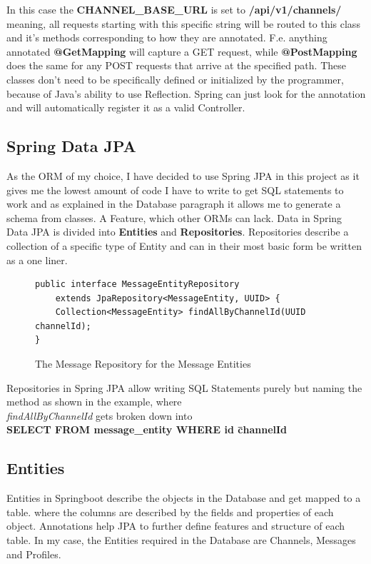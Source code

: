 \documentclass[a4paper,12pt]{article}
\begin{document}
	In this case the \textbf{CHANNEL\_BASE\_URL} is set to \textbf{/api/v1/channels/} meaning, all requests starting
	with this specific string will be routed to this class and it's methods corresponding to how they are annotated.
	F.e. anything annotated \textbf{@GetMapping} will capture a GET request, while \textbf{@PostMapping} does the 
	same for any POST requests that arrive at the specified path. These classes don't need to be specifically defined
	or initialized by the programmer, because of Java's ability to use Reflection. Spring can just look for the
	annotation and will automatically register it as a valid Controller.

	\subsection{Spring Data JPA}
	\label{subsec:spring_data_jpa}
	As the ORM of my choice, I have decided to use Spring JPA in this project as it gives me the lowest amount of
	code I have to write to get SQL statements to work and as explained in the Database paragraph it allows me to
	generate a schema from classes. A Feature, which other ORMs can lack.
	Data in Spring Data JPA is divided into \textbf{Entities} and \textbf{Repositories}. Repositories describe a
	collection of a specific type of Entity and can in their most basic form be written as a one liner.
	\begin{figure}[ht!]
		\begin{lstlisting}
public interface MessageEntityRepository 
	extends JpaRepository<MessageEntity, UUID> {
	Collection<MessageEntity> findAllByChannelId(UUID channelId);
}
		\end{lstlisting}
		\caption{The Message Repository for the Message Entities}
	\end{figure}
	Repositories in Spring JPA allow writing SQL Statements purely but naming the method as shown in the example,
	where\\ 
	\textit{findAllByChannelId} gets broken down into \\ 
	\textbf{SELECT \* FROM message\_entity WHERE id \= channelId}

	\subsection*{Entities}
	Entities in Springboot describe the objects in the Database and get mapped to a table. where the columns are
	described by the fields and properties of each object. Annotations help JPA to further define features and
	structure of each table. In my case, the Entities required in the Database are Channels, Messages and Profiles.
\end{document}
